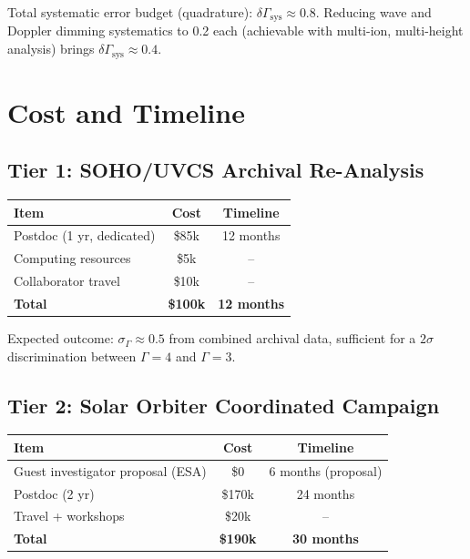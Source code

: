 \documentclass[11pt]{article}
\begin{document}
Total systematic error budget (quadrature): $\delta\Gamma_{\text{sys}}
\approx 0.8$.  Reducing wave and Doppler dimming systematics to 0.2
each (achievable with multi-ion, multi-height analysis) brings
$\delta\Gamma_{\text{sys}} \approx 0.4$.

\section{Cost and Timeline}
\label{sec:corona-cost}

\subsection{Tier 1: SOHO/UVCS Archival Re-Analysis}

\begin{center}
\begin{tabular}{lcc}
\toprule
\textbf{Item} & \textbf{Cost} & \textbf{Timeline} \\
\midrule
Postdoc (1 yr, dedicated) & \$85k & 12 months \\
Computing resources & \$5k & -- \\
Collaborator travel & \$10k & -- \\
\midrule
\textbf{Total} & \textbf{\$100k} & \textbf{12 months} \\
\bottomrule
\end{tabular}
\end{center}

Expected outcome: $\sigma_\Gamma \approx 0.5$ from combined archival
data, sufficient for a $2\sigma$ discrimination between $\Gamma = 4$
and $\Gamma = 3$.

\subsection{Tier 2: Solar Orbiter Coordinated Campaign}

\begin{center}
\begin{tabular}{lcc}
\toprule
\textbf{Item} & \textbf{Cost} & \textbf{Timeline} \\
\midrule
Guest investigator proposal (ESA) & \$0 & 6 months (proposal) \\
Postdoc (2 yr) & \$170k & 24 months \\
Travel + workshops & \$20k & -- \\
\midrule
\textbf{Total} & \textbf{\$190k} & \textbf{30 months} \\
\bottomrule
\end{tabular}
\end{center}
\end{document}
